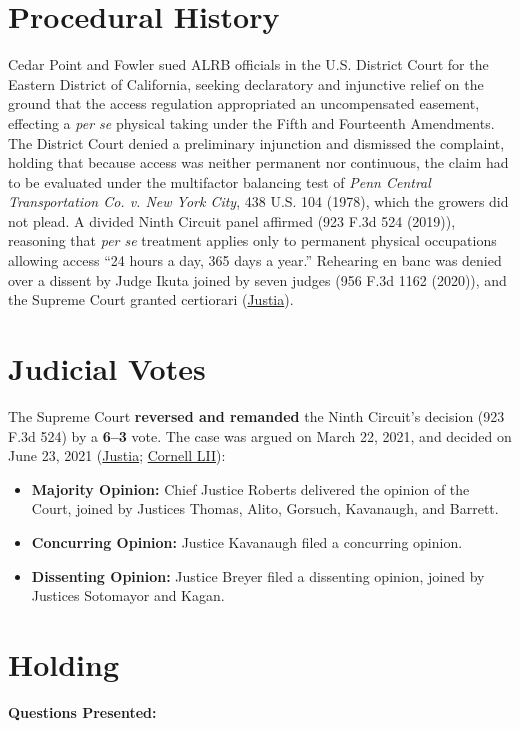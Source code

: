 \documentclass[12pt]{article}
\begin{document}
\section{Procedural History}
Cedar Point and Fowler sued ALRB officials in the U.S. District Court for the Eastern District of California, seeking declaratory and injunctive relief on the ground that the access regulation appropriated an uncompensated easement, effecting a \emph{per se} physical taking under the Fifth and Fourteenth Amendments. The District Court denied a preliminary injunction and dismissed the complaint, holding that because access was neither permanent nor continuous, the claim had to be evaluated under the multifactor balancing test of \textit{Penn Central Transportation Co. v. New York City}, 438 U.S. 104 (1978), which the growers did not plead. A divided Ninth Circuit panel affirmed (923 F.3d 524 (2019)), reasoning that \emph{per se} treatment applies only to permanent physical occupations allowing access ``24 hours a day, 365 days a year.'' Rehearing en banc was denied over a dissent by Judge Ikuta joined by seven judges (956 F.3d 1162 (2020)), and the Supreme Court granted certiorari (\href{https://supreme.justia.com/cases/federal/us/594/20-107/}{Justia}).

\section{Judicial Votes}
The Supreme Court \textbf{reversed and remanded} the Ninth Circuit's decision (923 F.3d 524) by a \textbf{6--3} vote. The case was argued on March 22, 2021, and decided on June 23, 2021 (\href{https://supreme.justia.com/cases/federal/us/594/20-107/}{Justia}; \href{https://www.law.cornell.edu/supremecourt/text/20-107}{Cornell LII}):

\begin{itemize}
    \item \textbf{Majority Opinion:} Chief Justice Roberts delivered the opinion of the Court, joined by Justices Thomas, Alito, Gorsuch, Kavanaugh, and Barrett.
    \item \textbf{Concurring Opinion:} Justice Kavanaugh filed a concurring opinion.
    \item \textbf{Dissenting Opinion:} Justice Breyer filed a dissenting opinion, joined by Justices Sotomayor and Kagan.
\end{itemize}

\section{Holding}
\textbf{Questions Presented:}
\end{document}
